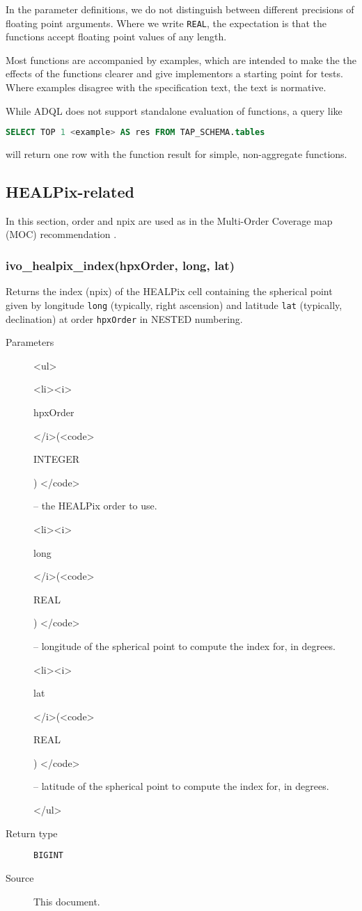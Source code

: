 \documentclass[11pt,a4paper]{ivoa}
\newenvironment{args}%
{\begin{html}<ul>\end{html}\def\arg##1(##2){\begin{html}<li><i>\end{html}%
  ##1 \begin{html}</i>(<code>\end{html}##2\begin{html}) </code>\end{html}}}%
{\begin{html}</ul>\end{html}}
\newenvironment{args}%
  {\hfil %
    \def\arg##1(##2){\item {\textit{##1} (\texttt{##2})}}
    \begin{list}{$\bullet$}{\topsep=0pt\partopsep=0pt\parsep=0pt}
    }%
  {\end{list}}
\begin{document}
In the parameter definitions, we do not distinguish between different
precisions of floating point arguments.  Where we write \texttt{REAL}, the
expectation is that the functions accept floating point values of any
length.

Most functions are accompanied by examples, which are intended to make
the the effects of the functions clearer and give implementors a
starting point for tests.  Where examples disagree with the
specification text, the text is normative.

While ADQL does not support standalone evaluation of functions, a query
like 
\begin{lstlisting}[language=SQL]
  SELECT TOP 1 <example> AS res FROM TAP_SCHEMA.tables
\end{lstlisting}
will return one row with the function result for simple, non-aggregate
functions.


\subsection{HEALPix-related}

In this section, order and npix are used as in the Multi-Order
Coverage map (MOC) recommendation
\citep{2014ivoa.spec.0602F}.

\subsubsection{ivo\_healpix\_index(hpxOrder, long, lat)}

Returns the index (npix) of the HEALPix cell containing the spherical
point given by longitude \texttt{long} (typically, right ascension) and
latitude \texttt{lat} (typically, declination) at order
\texttt{hpxOrder} in NESTED numbering.

\begin{description}
\item[Parameters]
\begin{args}
	\arg hpxOrder (INTEGER) -- the HEALPix order to use.
	\arg long (REAL) -- longitude of the spherical point to compute the
	index for, in degrees.
	\arg lat (REAL) -- latitude of the spherical point to compute the
	index for, in degrees.
\end{args}

\item[Return type] \texttt{BIGINT}

\item[Source] This document.
\end{description}
\end{document}
